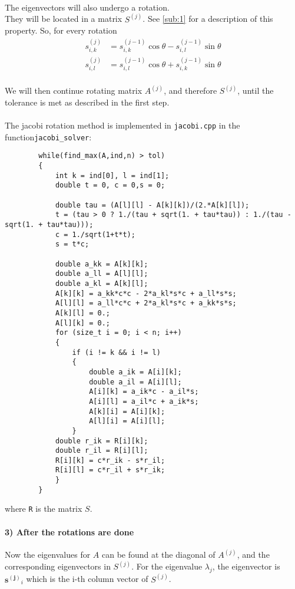 \documentclass[12pt]{article}
\newcommand\jjj{(j)}
\newcommand\jj{(j-1)}
\begin{document}
	  \\ 
	  The eigenvectors will also undergo a rotation. \\ They will be located in a matrix $S^{\jjj}$. See \ref{sub:1} for a description of this property. 
	  So, for every rotation 
	  \begin{align*}
	  	s_{i,k}^{\jjj} &= s_{i,k}^{\jj}\cos\theta  - s_{i,l}^{\jj} \sin\theta \\
	  	s_{i,l}^{\jjj} &= s_{i,l}^{\jj} \cos\theta + s_{i,k}^{\jj} \sin\theta  
	  \end{align*} \\
	  We will then continue rotating matrix $A^{\jjj}$, and therefore $S^{\jjj}$, until the tolerance is met as described in the first step. 
	  \\ \pagebreak \\
	  The jacobi rotation method is implemented in 
	  \texttt{jacobi.cpp} in the function\texttt{jacobi\_solver}:
	\begin{lstlisting}
		while(find_max(A,ind,n) > tol)
		{
			int k = ind[0], l = ind[1];
			double t = 0, c = 0,s = 0;
			
			double tau = (A[l][l] - A[k][k])/(2.*A[k][l]);
			t = (tau > 0 ? 1./(tau + sqrt(1. + tau*tau)) : 1./(tau - sqrt(1. + tau*tau)));
			c = 1./sqrt(1+t*t);
			s = t*c; 
			
			double a_kk = A[k][k];
			double a_ll = A[l][l];
			double a_kl = A[k][l];
			A[k][k] = a_kk*c*c - 2*a_kl*s*c + a_ll*s*s;
			A[l][l] = a_ll*c*c + 2*a_kl*s*c + a_kk*s*s;
			A[k][l] = 0.;
			A[l][k] = 0.;  
			for (size_t i = 0; i < n; i++)
			{
				if (i != k && i != l)
				{
					double a_ik = A[i][k];
					double a_il = A[i][l];
					A[i][k] = a_ik*c - a_il*s;
					A[i][l] = a_il*c + a_ik*s;
					A[k][i] = A[i][k];
					A[l][i] = A[i][l];
				}
			double r_ik = R[i][k];
			double r_il = R[i][l];
			R[i][k] = c*r_ik - s*r_il;
			R[i][l] = c*r_il + s*r_ik;
			}
		}
	\end{lstlisting}
	where \texttt{R} is the matrix $S$. 
	 \paragraph{3) After the rotations are done} Now the eigenvalues for $A$ can be found at the diagonal of $A^{\jjj}$, and the corresponding eigenvectors in $S^{\jjj}$. For the eigenvalue $\lambda_j$, the eigenvector is $\mathbf{s^{\jjj}}_i$ which is the i-th column vector of $S^{\jjj}$.  \pagebreak \\
\end{document}
